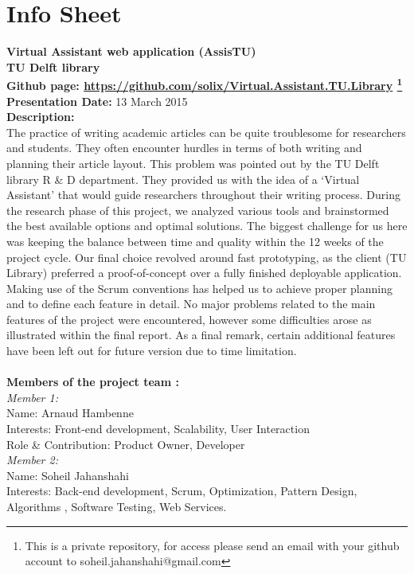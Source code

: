 \chapter{Info Sheet}    
\textbf{Virtual Assistant web application (AssisTU)\\}
\textbf{\small{TU Delft library\\}}
\textbf{Github page: \url{https://github.com/solix/Virtual.Assistant.TU.Library} \footnote{This is a private repository, for access please send an email with your github account to soheil.jahanshahi@gmail.com}\\} 
\textbf{Presentation Date: } 13 March 2015\\ 
\bigskip
\textbf{Description: \\}
 The practice of writing academic articles can be quite troublesome for researchers and students. They often encounter hurdles in terms of both writing 
 and planning their article layout. This problem was pointed out by the TU Delft library R \& D department. They provided us with the idea of a 
 `Virtual Assistant' that would guide researchers throughout their writing process. During the research phase of this project, we analyzed various tools and brainstormed the best available options 
 and optimal solutions. The biggest challenge for us here was keeping the balance between time and quality within the 12 weeks of the project cycle. 
 Our final choice revolved around fast prototyping, as the client (TU Library) preferred a proof-of-concept over a fully finished deployable application. 
 Making use of the Scrum conventions has helped us to achieve proper planning and to define each feature in detail. No major problems related to the 
 main features of the project were encountered, however some difficulties arose as illustrated within the final report. As a final remark, certain 
 additional features have been left out for future version due to time limitation.\\\\
 \textbf{Members of the project team :\\}
 \textit{Member 1: \\}
	Name: Arnaud Hambenne\\
	Interests: Front-end development, Scalability, User Interaction\\ 
	Role \& Contribution: Product Owner, Developer\\
   \textit{Member 2: \\}
   Name: Soheil Jahanshahi\\
   Interests: Back-end development, Scrum, Optimization, Pattern Design, Algorithms , Software Testing, Web Services.\\ 
